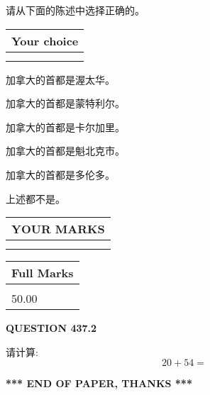 \documentclass{ctexart}
\begin{document}
  
请从下面的陈述中选择正确的。
  
  
\noindent\hspace{3.0in} \begin{tabular}{|l|}
\hline
Your choice \\
\hline
 \\ 
 \\ 
\hline
\end{tabular}
  
  
 
 
加拿大的首都是渥太华。
 
 
加拿大的首都是蒙特利尔。
 
 
加拿大的首都是卡尔加里。
 
 
加拿大的首都是魁北克市。
 
 
加拿大的首都是多伦多。
 
 
 上述都不是。
 
 
  
\vspace{0.2in}
  
\noindent\begin{tabular}{|l|}
\hline
 YOUR MARKS  \\
\hline
 \\ 
 \\ 
\hline
\end{tabular}
\hspace{0.05in} \begin{tabular}{|l|}
\hline
 Full Marks  \\
\hline
 \\ 
50.00 \\
\hline
\end{tabular}
{\textbf{\Large{QUESTION
437.2 
}}}
  
  
 
请计算:
\begin{equation}
20 +  %
54 = \nonumber
\end{equation}
 

 

 
   
   
 \vspace{0.2in}
 
   
   
   
   
\vspace{1.0in} 
{\textbf{\large{ *** END OF PAPER, THANKS *** }}} 
   
\end{document}
